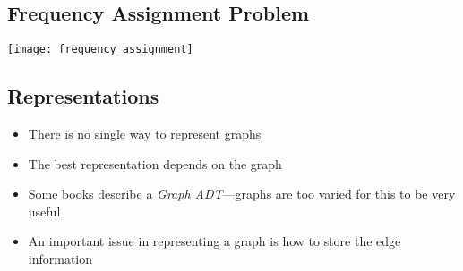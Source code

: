 
\begin{slide}
\section{Frequency Assignment Problem}

\begin{center}
  \texttt{[image: frequency\_assignment]}
\end{center}
\end{slide}


\Outline %


\begin{slide}
\section{Representations}

\begin{PauseHighLight}
  \begin{itemize}
  \item There is no single way to represent graphs\pause
  \item The best representation depends on the graph\pause
  \item Some books describe a \textit{Graph ADT}---graphs are too varied
    for this to be very useful\pause
  \item An important issue in representing a graph is how to store the
    edge information\pause
  \end{itemize}
\end{PauseHighLight}

\end{slide}



